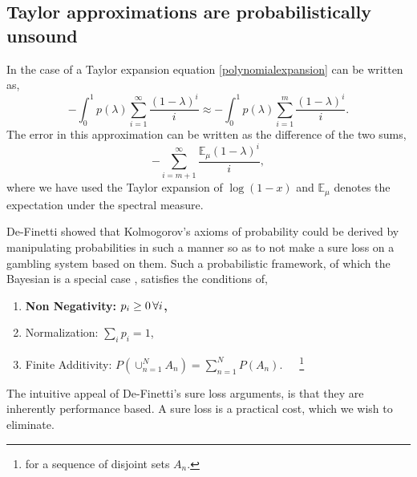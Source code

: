 \documentclass[letterpaper]{article} %
\begin{document}
\subsection{Taylor approximations are probabilistically unsound}
\label{taylorisshit}
In the case of a Taylor expansion equation \eqref{polynomialexpansion} can be written as,
\begin{equation}
-\int_{0}^{1} p(\lambda)\sum_{i=1}^{\infty}\frac{(1-\lambda)^{i}}{i} \approx  -\int_{0}^{1} p(\lambda)\sum_{i=1}^{m}\frac{(1-\lambda)^{i}}{i}.
\end{equation}
The error in this approximation can be written as the difference of the two sums,
\begin{equation}
\label{taylorerror}
-\sum_{i=m+1}^{\infty}\frac{\mathbb{E}_{\mu}(1-\lambda)^{i}}{i},
\end{equation}
where we have used the Taylor expansion of $\log(1-x)$ and $\mathbb{E}_{\mu}$ denotes the expectation under the spectral measure.

De-Finetti \cite{finetti}  showed that Kolmogorov's axioms of probability \cite{kolmogorov_1950} could be derived by manipulating probabilities in such a manner so as to not make a sure loss on a gambling system based on them. Such a probabilistic framework, of which the Bayesian is a special case \cite{bayesianspecialcase}, satisfies the conditions of,
\begin{enumerate}
	\item \bfseries{Non Negativity:} $p_{i} \geq 0 \thinspace \forall i$,
	\item Normalization: $\sum_{i}p_{i} = 1$,
	\item Finite Additivity: $P(\cup_{n=1}^{N}A_{n}) = \sum_{n=1}^{N}P(A_{n})$.~~~\footnote{for a sequence of disjoint sets $A_{n}$.}
\end{enumerate}
The intuitive appeal of De-Finetti's sure loss arguments, is that they are inherently performance based. A sure loss is a practical cost, which we wish to eliminate. 
\end{document}
